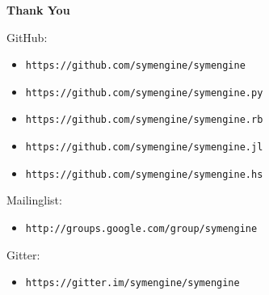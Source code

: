 \documentclass{beamer}
\begin{document}
\begin{frame}
\frametitle{}
{\Large\bf Thank You}
\medskip

GitHub:
\begin{itemize}
\item \texttt{https://github.com/symengine/symengine}
\item \texttt{https://github.com/symengine/symengine.py}
\item \texttt{https://github.com/symengine/symengine.rb}
\item \texttt{https://github.com/symengine/symengine.jl}
\item \texttt{https://github.com/symengine/symengine.hs}
\end{itemize}
Mailinglist:
\begin{itemize}
\item \texttt{http://groups.google.com/group/symengine}
\end{itemize}
Gitter:
\begin{itemize}
\item \texttt{https://gitter.im/symengine/symengine}
\end{itemize}
\end{frame}
\end{document}
